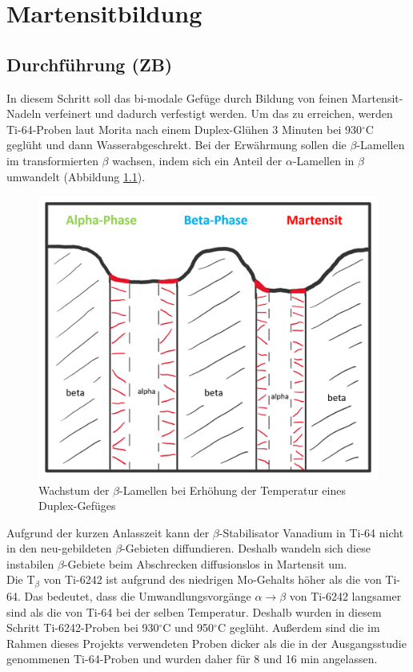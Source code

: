 \chapter{Martensitbildung}
\label{MB1}

\section{Durchführung (ZB)}

In diesem Schritt soll das bi-modale Gefüge durch Bildung von feinen Martensit-Nadeln verfeinert und dadurch verfestigt werden. Um das zu erreichen, werden Ti-64-Proben laut Morita \cite{Morita.2005} nach einem Duplex-Glühen 3 Minuten bei 930$^\circ$C geglüht und dann Wasserabgeschrekt. Bei der Erwährmung sollen die $\beta$-Lamellen im transformierten $\beta$ wachsen, indem sich ein Anteil der $\alpha$-Lamellen in $\beta$ umwandelt (Abbildung \ref{fig:martensit-einzeln}).

\begin{figure}[h]
	\centering
	\includegraphics[width=0.6\linewidth]{./Bilder/Martensit einzeln.png}
	\caption{Wachstum der $\beta$-Lamellen bei Erhöhung der Temperatur eines Duplex-Gefüges}
	\label{fig:martensit-einzeln}
\end{figure}

Aufgrund der kurzen Anlasszeit kann der $\beta$-Stabilisator Vanadium in Ti-64 nicht in den neu-gebildeten $\beta$-Gebieten diffundieren. Deshalb wandeln sich diese instabilen $\beta$-Gebiete beim Abschrecken diffusionslos in Martensit um.\\

Die T$_\beta$ von Ti-6242 ist aufgrund des niedrigen Mo-Gehalts höher als die von Ti-64. Das bedeutet, dass die Umwandlungsvorgänge $\alpha\rightarrow\beta$ von Ti-6242 langsamer sind als die von Ti-64 bei der selben Temperatur. Deshalb wurden in diesem Schritt Ti-6242-Proben bei 930$^\circ$C und 950$^\circ$C  geglüht. Außerdem sind die im Rahmen dieses Projekts verwendeten Proben dicker als die in der Ausgangsstudie \cite{Morita.2005} genommenen Ti-64-Proben und wurden daher für 8 und 16 min angelassen.

